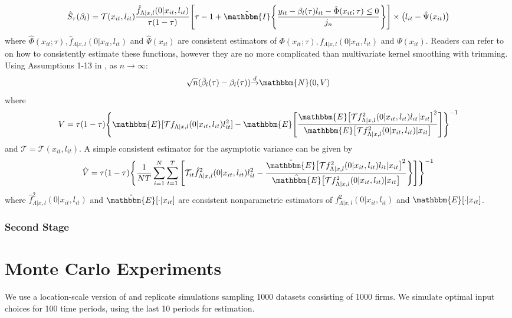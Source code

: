 \documentclass[11pt]{article}
\begin{document}
\begin{equation}
\hat{S}_{\tau}(\beta_{l})=\mathcal{T}(x_{it}, l_{it})\frac{\hat{f}_{\Lambda|x,l}(0|x_{it},l_{it})}{\tau(1-\tau)}\Bigg[\tau-1+\tilde{\mathbbm{I}}\Bigg\{\frac{y_{it}-\beta_{l}(\tau)l_{it}-\hat{\Phi}(x_{it}; \tau)\leq0}{j_{n}}\Bigg\}\Bigg]\times\big(l_{it}-\hat{\Psi}(x_{it})\big)
\end{equation}
where $\hat{\Phi}(x_{it}; \tau), \hat{f}_{\Lambda|x,l}(0|x_{it},l_{it})$ and $\hat{\Psi}(x_{it})$ are consistent estimators of $\Phi(x_{it}; \tau), f_{\Lambda|x,l}(0|x_{it},l_{it})$ and $\Psi(x_{it})$. Readers can refer to \cite{Lee2003} on how to consistently estimate these functions, however they are no more complicated than multivariate kernel smoothing with trimming. Using Assumptions 1-13 in \cite{Lee2003}, as $n\rightarrow \infty$:
\begin{equation*}
\sqrt{n}(\bar{\beta}_{l}(\tau)-\beta_{l}(\tau))\overset{d}{\operatorname{\rightarrow}}\mathbbm{N}(0,V)\\
\end{equation*}
where
\begin{equation}
V=\tau(1-\tau)\Bigg\{\mathbbm{E}[\mathcal{T}f_{\Lambda|x,l}(0|x_{it},l_{it})l^{2}_{it}]-\mathbbm{E}\Bigg[\frac{\mathbbm{E}\big[\mathcal{T}f^{2}_{\Lambda|x,l}(0|x_{it},l_{it})l_{it}|x_{it}\big]^{2}}{\mathbbm{E}\big[\mathcal{T}f^{2}_{\Lambda|x,l}(0|x_{it},l_{it})|x_{it}\big]}\Bigg]\Bigg\}^{-1}
\end{equation}
and $\mathcal{T}=\mathcal{T}(x_{it}, l_{it})$. A simple consistent estimator for the asymptotic variance can be given by
\begin{equation}
\hat{V}=\tau(1-\tau)\Bigg\{\frac{1}{NT}\sum_{i=1}^{N}\sum_{t=1}^{T}\Bigg[\mathcal{T}_{it}\hat{f}_{\Lambda|x,l}^{2}(0|x_{it},l_{it})l_{it}^{2}-\frac{\hat{\mathbbm{E}}\big[\mathcal{T}f^{2}_{\Lambda|x,l}(0|x_{it},l_{it})l_{it}|x_{it}\big]^{2}}{\hat{\mathbbm{E}}\big[\mathcal{T}f^{2}_{\Lambda|x,l}(0|x_{it},l_{it})|x_{it}\big]}\Bigg\}\Bigg]\Bigg\}^{-1}
\end{equation}
where $\hat{f}_{\Lambda|x,l}^{2}(0|x_{it},l_{it})$ and $\hat{\mathbbm{E}}[\cdot|x_{it}]$ are consistent nonparametric estimators of $f_{\Lambda|x,l}^{2}(0|x_{it},l_{it})$ and $\mathbbm{E}[\cdot|x_{it}]$. 


\subsubsection*{Second Stage}

\newpage
\section{Monte Carlo Experiments}
We use a location-scale version of \cite{Levinsohn2003} and replicate \cite{Ackerberg2015} simulations sampling 1000 datasets consisting of 1000 firms. We simulate optimal input choices for 100 time periods, using the last 10 periods for estimation. 
\end{document}

